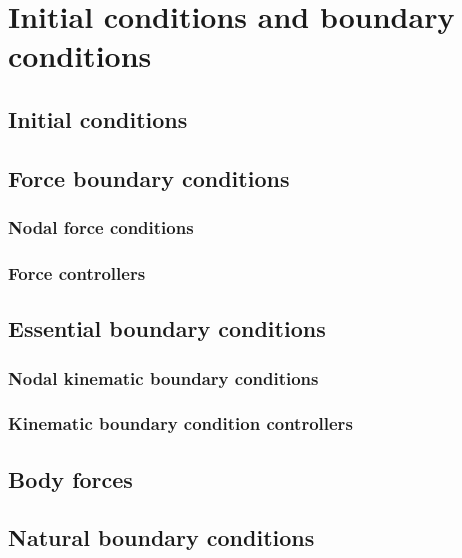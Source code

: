 
\section{Initial conditions and boundary conditions}
\label{set.ICandBC}
\subsection{Initial conditions}
\subsection{Force boundary conditions}
\subsubsection{Nodal force conditions}
\subsubsection{Force controllers}
\subsection{Essential boundary conditions}
\subsubsection{Nodal kinematic boundary conditions}
\subsubsection{Kinematic boundary condition controllers}
\subsection{Body forces}
\subsection{Natural boundary conditions}